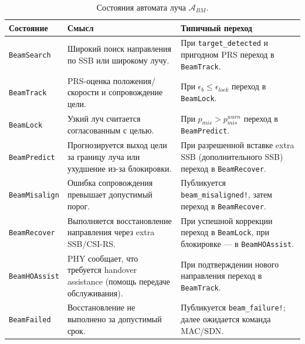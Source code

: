 \documentclass[12pt,a4paper]{article}
\begin{document}
\begin{table}[htbp]
\centering
\small
\setlength{\tabcolsep}{4pt}
\begin{tabularx}{\textwidth}{p{}YY}
\toprule
Состояние & Смысл & Типичный переход \\
\midrule
\texttt{BeamSearch} & Широкий поиск направления по SSB или широкому лучу. & При \texttt{target\_detected} и пригодном PRS переход в \texttt{BeamTrack}. \\
\texttt{BeamTrack} & PRS-оценка положения/скорости и сопровождение цели. & При $\epsilon_b\le\epsilon_{lock}$ переход в \texttt{BeamLock}. \\
\texttt{BeamLock} & Узкий луч считается согласованным с целью. & При $p_{mis}>p_{mis}^{warn}$ переход в \texttt{BeamPredict}. \\
\texttt{BeamPredict} & Прогнозируется выход цели за границу луча или ухудшение из-за блокировки. & При разрешенной вставке extra SSB (дополнительного SSB) переход в \texttt{BeamRecover}. \\
\texttt{BeamMisalign} & Ошибка сопровождения превышает допустимый порог. & Публикуется \texttt{beam\_misaligned!}, затем переход в \texttt{BeamRecover}. \\
\texttt{BeamRecover} & Выполняется восстановление направления через extra SSB/CSI-RS. & При успешной коррекции переход в \texttt{BeamLock}, при блокировке --- в \texttt{BeamHOAssist}. \\
\texttt{BeamHOAssist} & PHY сообщает, что требуется handover assistance (помощь передаче обслуживания). & При подтверждении нового направления переход в \texttt{BeamTrack}. \\
\texttt{BeamFailed} & Восстановление не выполнено за допустимый срок. & Публикуется \texttt{beam\_failure!}; далее ожидается команда MAC/SDN. \\
\bottomrule
\end{tabularx}
\caption{Состояния автомата луча $\mathcal{A}_{BM}$.}
\label{tab:beam_states}
\end{table}
\end{document}
